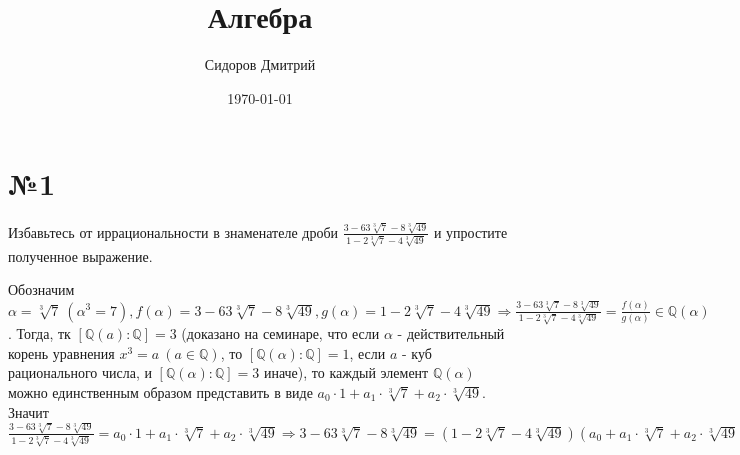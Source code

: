 \documentclass[a4paper, 16pt]{article}
\title{Алгебра}
\date{\today}
\author{Сидоров Дмитрий}
\affil{Группа БПМИ 219}
\newcommand{\Q} {\mathbb{Q}}
\newenvironment{solution}[1][Решение]{%
	\begin{trivlist}
		\item[\hskip \labelsep {\bfseries #1:}]
		\item \hspace{15pt}
	}{
	\end{trivlist}
}
\begin{document}
	\maketitle
	
	\section*{№1}
	
		Избавьтесь от иррациональности в знаменателе дроби 
		$\frac{3 - 63\sqrt[3]{7} - 8 \sqrt[3]{49}}{1 - 2 \sqrt[3]{7} - 4\sqrt[3]{49}}$ и упростите
		полученное выражение.
		
		\begin{solution}
			Обозначим $\alpha = \sqrt[3]{7}  \ (\alpha^3 = 7), f(\alpha) = 3 - 63\sqrt[3]{7} - 8 \sqrt[3]{49}, g(\alpha) = 1 - 2 \sqrt[3]{7} - 4\sqrt[3]{49} \Rightarrow 
			\frac{3 - 63\sqrt[3]{7} - 8 \sqrt[3]{49}}{1 - 2 \sqrt[3]{7} - 4\sqrt[3]{49}} = \frac{f(\alpha)}{g(\alpha)} \in \Q(\alpha)$. Тогда, тк $[\Q(a) : \Q] = 3$ (доказано на семинаре, что если $\alpha$ - действительный корень уравнения $x^3 = a \ (a \in \Q)$, то $[\Q(\alpha) : \Q] = 1$, если $a$ - куб рационального числа, и $[\Q(\alpha) : \Q] = 3$ иначе), то каждый элемент $\Q(\alpha)$ можно единственным образом представить в виде $a_0 \cdot 1 + a_1 \cdot \sqrt[3]{7} + a_2 \cdot \sqrt[3]{49}$. Значит $\frac{3 - 63\sqrt[3]{7} - 8 \sqrt[3]{49}}{1 - 2 \sqrt[3]{7} - 4\sqrt[3]{49}} = a_0 \cdot 1 + a_1 \cdot \sqrt[3]{7} + a_2 \cdot \sqrt[3]{49} \Rightarrow 3 - 63\sqrt[3]{7} - 8 \sqrt[3]{49} = (1 - 2 \sqrt[3]{7} - 4\sqrt[3]{49})(a_0 + a_1 \cdot \sqrt[3]{7} + a_2 \cdot \sqrt[3]{49}) = a_0 - 2\sqrt[3]{7}a_0 - 4\sqrt[3]{49}a_0 + a_1\sqrt[3]{7} - a_1 \cdot 2\sqrt[3]{49} - 28a_1 + a_2\sqrt[3]{49} - 14a_2 - 28a_2\sqrt[3]{7} = (a_0 -28a_1 - 14a_2) + \sqrt[3]{7}(-2a_0 + a_1 -28a_2) + \sqrt[3]{49}(-4a_0 - 2a_1 + a_2) \Rightarrow$
			

\end{solution}
\end{document}

